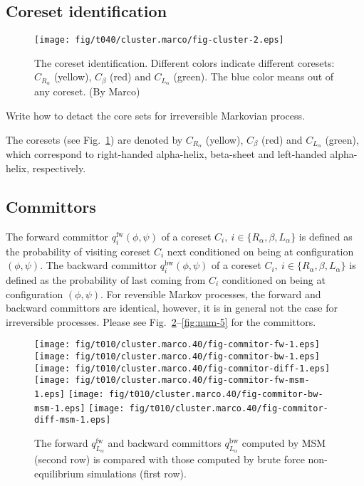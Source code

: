 \documentclass[aps, pre, preprint,unsortedaddress,a4paper,onecolumn]{revtex4}
\newcommand{\redc}[1]{{\color{red} #1}}
\newcommand{\fwd}[0]{\textrm{fw}}
\newcommand{\bwd}[0]{\textrm{bw}}
\begin{document}
\subsection{Coreset identification}

\begin{figure}
  \centering
  \texttt{[image: fig/t040/cluster.marco/fig-cluster-2.eps]}
  \caption{The coreset identification. Different colors indicate different coresets: $C_{R_\alpha}$ (yellow), $C_\beta$ (red) and $C_{L_\alpha}$ (green).
    The blue color means out of any coreset. (By Marco)}
  \label{fig:cluster}
\end{figure}

\redc{Write how to detact the core sets for irreversible Markovian process}.

The coresets (see Fig.~\ref{fig:cluster}) are denoted by $C_{R_\alpha}$ (yellow), $C_\beta$ (red) and $C_{L_\alpha}$ (green), which correspond to
right-handed alpha-helix, beta-sheet and left-handed alpha-helix, respectively.


\subsection{Committors}

The forward committor $q^\fwd_i(\phi,\psi)$ of a coreset $C_i,\ i\in\{R_\alpha, \beta, L_\alpha\}$ is defined as
the probability of visiting coreset $C_i$ next conditioned on being at configuration $(\phi,\psi)$.
The backward committor $q^\bwd_i(\phi,\psi)$ of a coreset $C_i,\ i\in\{R_\alpha, \beta, L_\alpha\}$ is defined as
the probability of last coming from $C_i$  conditioned on being at configuration $(\phi,\psi)$.
For  reversible Markov processes, the forward and backward committors are identical, however, it is in general not the case
for irreversible processes. Please see Fig.~\ref{fig:num-3}--\ref{fig:num-5} for the committors.

\begin{figure}
  \centering
  \texttt{[image: fig/t010/cluster.marco.40/fig-commitor-fw-1.eps]}
  \texttt{[image: fig/t010/cluster.marco.40/fig-commitor-bw-1.eps]}
  \texttt{[image: fig/t010/cluster.marco.40/fig-commitor-diff-1.eps]}\\
  \texttt{[image: fig/t010/cluster.marco.40/fig-commitor-fw-msm-1.eps]}
  \texttt{[image: fig/t010/cluster.marco.40/fig-commitor-bw-msm-1.eps]}
  \texttt{[image: fig/t010/cluster.marco.40/fig-commitor-diff-msm-1.eps]}
  \caption{The forward $q^\fwd_{L_\alpha}$ and backward committors $q^\bwd_{L_\alpha}$ computed by MSM (second row) is compared with those computed by brute force non-equilibrium simulations (first row).}
  \label{fig:num-3}
\end{figure}
\end{document}
